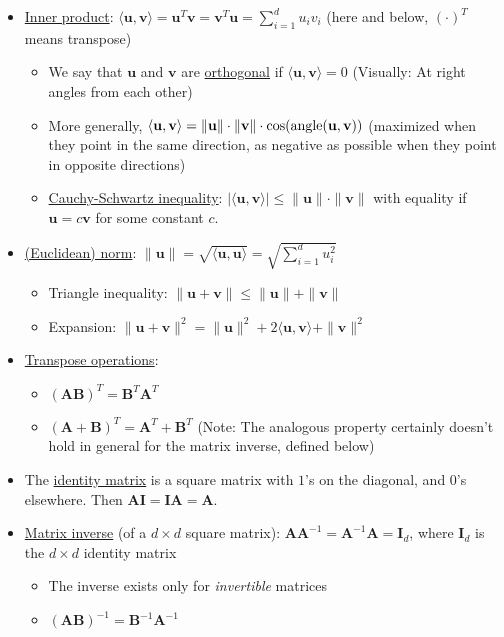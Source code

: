 \documentclass[11pt]{article}
\newcommand{\uv}{\mathbf{u}}
\newcommand{\vv}{\mathbf{v}}
\newcommand{\Av}{\mathbf{A}}
\newcommand{\Bv}{\mathbf{B}}
\newcommand{\Iv}{\mathbf{I}}
\begin{document}
\begin{itemize}
	\item \underline{Inner product}: $\langle \uv, \vv \rangle = \uv^T \vv = \vv^T \uv = \sum_{i=1}^d u_i v_i$  (here and below, $(\cdot)^T$ means transpose)
	\begin{itemize}
		\item We say that $\uv$ and $\vv$ are \underline{orthogonal} if $\langle \uv, \vv \rangle = 0$ (Visually: At right angles from each other)
		\item More generally, $\langle \uv, \vv \rangle = \|\uv\| \cdot \|\vv\| \cdot \cos({\rm angle}(\uv,\vv))$ (maximized when they point in the same direction, as negative as possible when they point in opposite directions)
		\item \underline{Cauchy-Schwartz inequality}: $|\langle \uv, \vv \rangle| \le \|\uv\| \cdot \|\vv\|$ with equality if $\uv = c \vv$ for some constant $c$.
	\end{itemize}
	\item \underline{(Euclidean) norm}: $\| \uv \| = \sqrt{ \langle \uv, \uv \rangle } = \sqrt{\sum_{i=1}^d u_i^2}$
	\begin{itemize}
		\item {Triangle inequality}: $\|\uv + \vv\| \le \|\uv\| + \|\vv\|$
		\item {Expansion}: $\|\uv + \vv\|^2 = \|\uv\|^2 + 2\langle \uv,\vv \rangle + \|\vv\|^2$
	\end{itemize}
	\item \underline{Transpose operations}:
	\begin{itemize}
		\item $(\Av\Bv)^T = \Bv^T \Av^T$
		\item $(\Av + \Bv)^T = \Av^T + \Bv^T$ (Note: The analogous property certainly doesn't hold in general for the matrix inverse, defined below)
	\end{itemize}
	\item The \underline{identity matrix} is a square matrix with $1$'s on the diagonal, and $0$'s elsewhere.  Then $\Av\Iv = \Iv\Av = \Av$. 
	\item \underline{Matrix inverse} (of a $d \times d$ square matrix): $\Av \Av^{-1} = \Av^{-1} \Av = \Iv_d$, where $\Iv_d$ is the $d \times d$ identity matrix
	\begin{itemize}
		\item The inverse exists only for {\em invertible} matrices
		\item $(\Av\Bv)^{-1} = \Bv^{-1} \Av^{-1}$
	\end{itemize}

\end{itemize}
\end{document}

